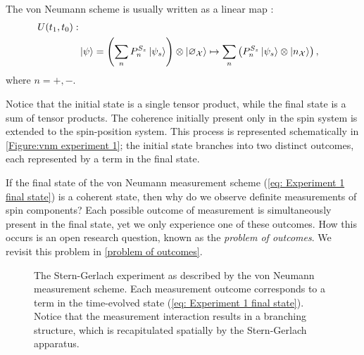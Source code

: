 The von Neumann scheme is usually written as a linear map \cite{Schlosshauer}:
\begin{align} \label{eq: general final state}
    \nonumber U(t_1, t_0): \\
    & \ket{\psi} = \left(\sum_{n} P^{S_z}_n\ket{\psi_s}\right) \otimes \ket{\varnothing_\mathcal{X}} \mapsto \sum_{n}\left(P^{S_z}_n\ket{\psi_s} \otimes \ket{n_\mathcal{X}}\right),
\end{align}
where $n = +, -$.

Notice that the initial state is a single tensor product, while the final state is a sum of tensor products. The coherence initially present only in the spin system is extended to the spin-position system. This process is represented schematically in \autoref{Figure:vnm experiment 1}; the initial state branches into two distinct outcomes, each represented by a term in the final state.

If the final state of the von Neumann measurement scheme (\autoref{eq: Experiment 1 final state}) is a coherent state, then why do we observe definite measurements of spin components? Each possible outcome of measurement is simultaneously present in the final state, yet we only experience one of these outcomes. How this occurs is an open research question, known as the \textit{problem of outcomes}. We revisit this problem in \autoref{problem of outcomes}.
\begin{figure}
\centering\CaptionFontSize
{}

\caption[Unitary measurement for Stern-Gerlach Experiment 1]
{The Stern-Gerlach experiment as described by the von Neumann measurement scheme. Each measurement outcome corresponds to a term in the time-evolved state (\autoref{eq: Experiment 1 final state}). Notice that the measurement interaction results in a branching structure, which is recapitulated spatially by the Stern-Gerlach apparatus.}
\label{Figure:vnm experiment 1}
\end{figure}

